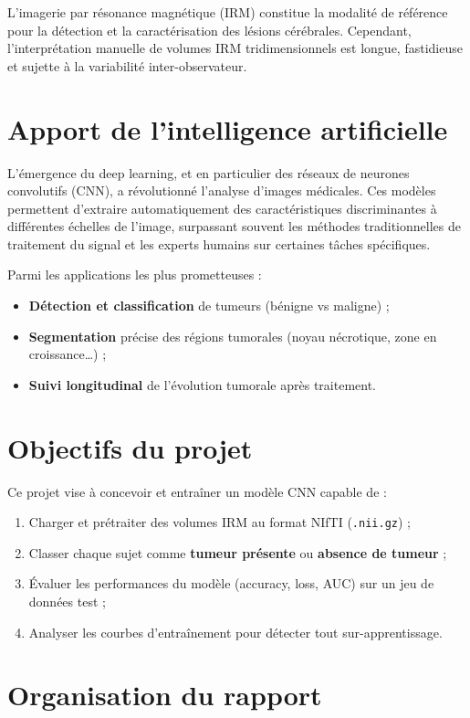 \documentclass[12pt, a4paper]{report}
\begin{document}
L'imagerie par résonance magnétique (IRM) constitue la modalité de référence pour la détection
et la caractérisation des lésions cérébrales.
Cependant, l'interprétation manuelle de volumes IRM tridimensionnels est longue, fastidieuse et
sujette à la variabilité inter-observateur.

\section{Apport de l'intelligence artificielle}

L'émergence du deep learning, et en particulier des réseaux de neurones convolutifs (CNN),
a révolutionné l'analyse d'images médicales.
Ces modèles permettent d'extraire automatiquement des caractéristiques discriminantes
à différentes échelles de l'image, surpassant souvent les méthodes traditionnelles
de traitement du signal et les experts humains sur certaines tâches spécifiques.

Parmi les applications les plus prometteuses :
\begin{itemize}
  \item \textbf{Détection et classification} de tumeurs (bénigne vs maligne) ;
  \item \textbf{Segmentation} précise des régions tumorales (noyau nécrotique, zone en croissance…) ;
  \item \textbf{Suivi longitudinal} de l'évolution tumorale après traitement.
\end{itemize}

\section{Objectifs du projet}

Ce projet vise à concevoir et entraîner un modèle CNN capable de :
\begin{enumerate}
  \item Charger et prétraiter des volumes IRM au format NIfTI (\texttt{.nii.gz}) ;
  \item Classer chaque sujet comme \textbf{tumeur présente} ou \textbf{absence de tumeur} ;
  \item Évaluer les performances du modèle (accuracy, loss, AUC) sur un jeu de données test ;
  \item Analyser les courbes d'entraînement pour détecter tout sur-apprentissage.
\end{enumerate}

\section{Organisation du rapport}
\end{document}
